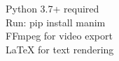 \documentclass[preview]{standalone}
\begin{document}
Python 3.7+ required\\Run: pip install manim\\FFmpeg for video export\\LaTeX for text rendering\\
\end{document}
